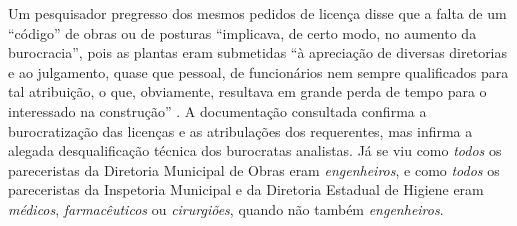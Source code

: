 Um pesquisador pregresso dos mesmos pedidos de licença disse que a falta de um ``código'' de obras ou de posturas ``implicava, de certo modo, no aumento da burocracia'', pois as plantas eram submetidas ``à apreciação de diversas diretorias e ao julgamento, quase que pessoal, de funcionários nem sempre qualificados para tal atribuição, o que, obviamente, resultava em grande perda de tempo para o interessado na construção'' \cite[p.~89]{cardoso_vilas_1991}. A documentação consultada confirma a burocratização das licenças e as atribulações dos requerentes, mas infirma a alegada desqualificação técnica dos burocratas analistas. Já se viu como \textit{todos} os pareceristas da Diretoria Municipal de Obras eram \textit{engenheiros}, e como \textit{todos} os pareceristas da Inspetoria Municipal e da Diretoria Estadual de Higiene eram \textit{médicos}, \textit{farmacêuticos} ou \textit{cirurgiões}, quando não também \textit{engenheiros}. 

